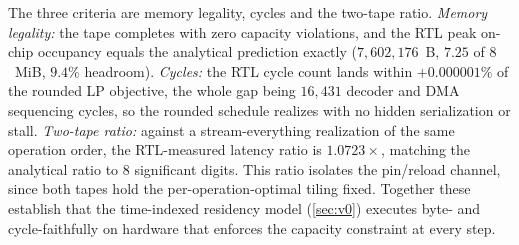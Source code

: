 The three criteria are memory legality, cycles and the two-tape ratio.
\emph{Memory legality:} the tape completes with zero capacity violations, and the RTL peak on-chip occupancy equals the analytical prediction exactly ($7{,}602{,}176$~B, $7.25$ of $8$~MiB, $9.4\%$ headroom).
\emph{Cycles:} the RTL cycle count lands within $+0.000001\%$ of the rounded LP objective, the whole gap being $16{,}431$ decoder and DMA sequencing cycles, so the rounded schedule realizes with no hidden serialization or stall.
\emph{Two-tape ratio:} against a stream-everything realization of the same operation order, the RTL-measured latency ratio is $1.0723\times$, matching the analytical ratio to $8$ significant digits.
This ratio isolates the pin/reload channel, since both tapes hold the per-operation-optimal tiling fixed.
Together these establish that the time-indexed residency model (\cref{sec:v0}) executes byte- and cycle-faithfully on hardware that enforces the capacity constraint at every step.

